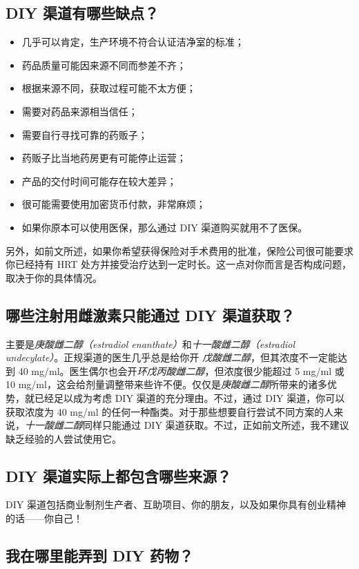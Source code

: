 \documentclass{article}
\begin{document}
\subsection{DIY 渠道有哪些缺点？}

\begin{itemize}
  \item 几乎可以肯定，生产环境不符合认证洁净室的标准；
    \item 药品质量可能因来源不同而参差不齐；
    \item 根据来源不同，获取过程可能不太方便；
    \item 需要对药品来源相当信任；
    \item 需要自行寻找可靠的药贩子；
    \item 药贩子比当地药房更有可能停止运营；
    \item 产品的交付时间可能存在较大差异；
    \item 很可能需要使用加密货币付款，非常麻烦；
    \item 如果你原本可以使用医保，那么通过 DIY 渠道购买就用不了医保。
\end{itemize}
另外，如前文所述，如果你希望获得保险对手术费用的批准，保险公司很可能要求你已经持有 HRT 处方并接受治疗达到一定时长。这一点对你而言是否构成问题，取决于你的具体情况。

\subsection{哪些注射用雌激素只能通过 DIY 渠道获取？}

主要是\textit{庚酸雌二醇（estradiol enanthate）}和\textit{十一酸雌二醇（estradiol undecylate）}。正规渠道的医生几乎总是给你开 \textit{戊酸雌二醇}，但其浓度不一定能达到 40 mg/ml。医生偶尔也会开\textit{环戊丙酸雌二醇}，但浓度很少能超过 5 mg/ml 或 10 mg/ml，这会给剂量调整带来些许不便。仅仅是\textit{庚酸雌二醇}所带来的诸多优势，就已经足以成为考虑 DIY 渠道的充分理由。不过，通过 DIY 渠道，你可以获取浓度为 40 mg/ml 的任何一种酯类。对于那些想要自行尝试不同方案的人来说，\textit{十一酸雌二醇}同样只能通过 DIY 渠道获取。不过，正如前文所述，我不建议缺乏经验的人尝试使用它。

\subsection{DIY 渠道实际上都包含哪些来源？}

DIY 渠道包括商业制剂生产者、互助项目、你的朋友，以及如果你具有创业精神的话——你自己！

\subsection{我在哪里能弄到 DIY 药物？}
\end{document}
